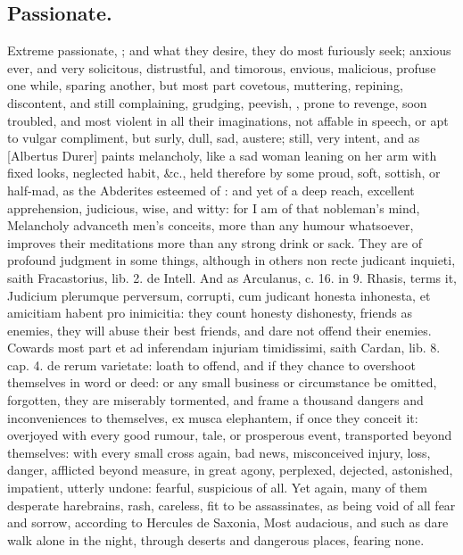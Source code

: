 {\subsection{Passionate.}
Extreme passionate, ; and
what they desire, they do most furiously seek; anxious ever, and very
solicitous, distrustful, and timorous, envious, malicious, profuse one
while, sparing another, but most part covetous, muttering, repining,
discontent, and still complaining, grudging, peevish, , prone to revenge, soon troubled, and most violent in all their
imaginations, not affable in speech, or apt to vulgar compliment, but
surly, dull, sad, austere;  still, very intent, and as
[Albertus Durer] paints melancholy, like a sad woman leaning on
her arm with fixed looks, neglected habit, \&c., held therefore by some
proud, soft, sottish, or half-mad, as the Abderites esteemed of
\Democritus{}: and yet of a deep reach, excellent apprehension, judicious,
wise, and witty: for I am of that nobleman's mind, Melancholy
advanceth men's conceits, more than any humour whatsoever, improves
their meditations more than any strong drink or sack. They are of
profound judgment in some things, although in others non recte judicant
inquieti, saith Fracastorius, lib. 2. de Intell. And as Arculanus, c.
16. in 9. Rhasis, terms it, Judicium plerumque perversum, corrupti, cum
judicant honesta inhonesta, et amicitiam habent pro inimicitia: they
count honesty dishonesty, friends as enemies, they will abuse their
best friends, and dare not offend their enemies. Cowards most part et
ad inferendam injuriam timidissimi, saith Cardan, lib. 8. cap. 4. de
rerum varietate: loath to offend, and if they chance to overshoot
themselves in word or deed: or any small business or circumstance be
omitted, forgotten, they are miserably tormented, and frame a thousand
dangers and inconveniences to themselves, ex musca elephantem, if once
they conceit it: overjoyed with every good rumour, tale, or prosperous
event, transported beyond themselves: with every small cross again, bad
news, misconceived injury, loss, danger, afflicted beyond measure, in
great agony, perplexed, dejected, astonished, impatient, utterly
undone: fearful, suspicious of all. Yet again, many of them desperate
harebrains, rash, careless, fit to be assassinates, as being void of
all fear and sorrow, according to Hercules de Saxonia, Most
audacious, and such as dare walk alone in the night, through deserts
and dangerous places, fearing none.

}
